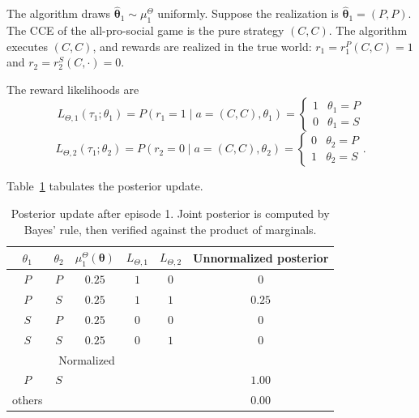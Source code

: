 The algorithm draws $\hat{\boldsymbol{\theta}}_1 \sim \mu_1^\Theta$ uniformly. Suppose the realization is $\hat{\boldsymbol{\theta}}_1 = (P, P)$. The CCE of the all-pro-social game is the pure strategy $(C, C)$. The algorithm executes $(C, C)$, and rewards are realized in the true world: $r_1 = r_1^P(C, C) = 1$ and $r_2 = r_2^S(C, \cdot) = 0$.

The reward likelihoods are
\begin{equation}
L_{\Theta,1}(\tau_1; \theta_1) = P(r_1 = 1 \mid a = (C,C), \theta_1) = \begin{cases} 1 & \theta_1 = P \\ 0 & \theta_1 = S \end{cases}
\end{equation}
\begin{equation}
L_{\Theta,2}(\tau_1; \theta_2) = P(r_2 = 0 \mid a = (C,C), \theta_2) = \begin{cases} 0 & \theta_2 = P \\ 1 & \theta_2 = S \end{cases}.
\end{equation}

Table~\ref{tab:posterior-update} tabulates the posterior update.

\begin{table}[ht]
\caption{Posterior update after episode 1. Joint posterior is computed by Bayes' rule, then verified against the product of marginals.}
\label{tab:posterior-update}
\begin{center}
\begin{tabular}{cccccc}
\toprule
$\theta_1$ & $\theta_2$ & $\mu_1^\Theta(\boldsymbol{\theta})$ & $L_{\Theta,1}$ & $L_{\Theta,2}$ & Unnormalized posterior \\
\midrule
$P$ & $P$ & $0.25$ & $1$ & $0$ & $0$ \\
$P$ & $S$ & $0.25$ & $1$ & $1$ & $0.25$ \\
$S$ & $P$ & $0.25$ & $0$ & $0$ & $0$ \\
$S$ & $S$ & $0.25$ & $0$ & $1$ & $0$ \\
\midrule
\multicolumn{3}{r}{Normalized} & & & \\
$P$ & $S$ & & & & $1.00$ \\
others & & & & & $0.00$ \\
\bottomrule
\end{tabular}
\end{center}
\end{table}

